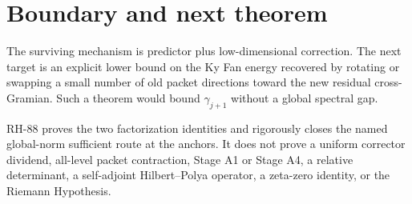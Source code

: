 \documentclass[11pt]{article}
\theoremstyle{remark}
\begin{document}
\section{Boundary and next theorem}

The surviving mechanism is predictor plus low-dimensional correction.  The
next target is an explicit lower bound on the Ky Fan energy recovered by
rotating or swapping a small number of old packet directions toward the new
residual cross-Gramian.  Such a theorem would bound $\gamma_{j+1}$ without a
global spectral gap.

RH-88 proves the two factorization identities and rigorously closes the named
global-norm sufficient route at the anchors.  It does not prove a uniform
corrector dividend, all-level packet contraction, Stage A1 or Stage A4, a
relative determinant, a self-adjoint Hilbert--Polya operator, a zeta-zero
identity, or the Riemann Hypothesis.



\end{document}
